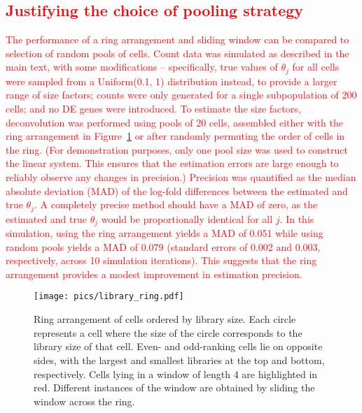 \documentclass{article}
\newcommand\revised[1]{\textcolor{red}{#1}}
\begin{document}
\revised{\section{Justifying the choice of pooling strategy}
The performance of a ring arrangement and sliding window can be compared to selection of random pools of cells.
Count data was simulated as described in the main text, with some modifications -- specifically, true values of $\theta_j$ for all cells were sampled from a Uniform(0.1, 1) distribution instead, to provide a larger range of size factors; counts were only generated for a single subpopulation of 200 cells; and no DE genes were introduced.
To estimate the size factors, deconvolution was performed using pools of 20 cells, assembled either with the ring arrangement in Figure~\ref{fig:library_ring} or after randomly permuting the order of cells in the ring.
(For demonstration purposes, only one pool size was used to construct the linear system.
This ensures that the estimation errors are large enough to reliably observe any changes in precision.)
Precision was quantified as the median absolute deviation (MAD) of the log-fold differences between the estimated and true $\theta_j$.
A completely precise method should have a MAD of zero, as the estimated and true $\theta_j$ would be proportionally identical for all $j$.
In this simulation, using the ring arrangement yields a MAD of 0.051 while using random pools yields a MAD of 0.079 (standard errors of 0.002 and 0.003, respectively, across 10 simulation iterations).
This suggests that the ring arrangement provides a modest improvement in estimation precision.
}


\begin{figure}[btp]
    \begin{center}
        \texttt{[image: pics/library\_ring.pdf]}
    \end{center}
    \caption{
        Ring arrangement of cells ordered by library size.
        Each circle represents a cell where the size of the circle corresponds to the library size of that cell.
        Even- and odd-ranking cells lie on opposite sides, with the largest and smallest libraries at the top and bottom, respectively.
        Cells lying in a window of length 4 are highlighted in red.
        Different instances of the window are obtained by sliding the window across the ring.
    }
    \label{fig:library_ring}
\end{figure}
\end{document}
